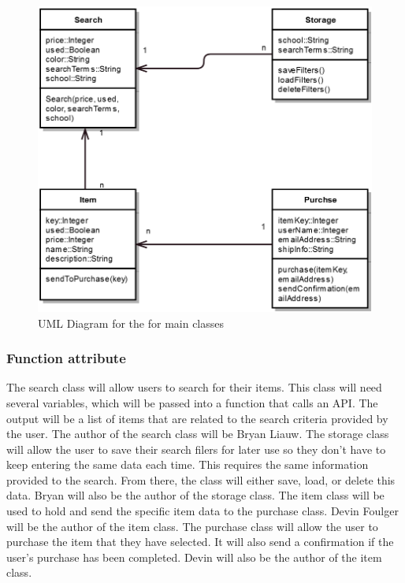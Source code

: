\documentclass[journal,compsoc, 10pt, draftclsnofoot, onecolumn]{IEEEtran}
\begin{document}
\begin{figure}[h]
\centering
\caption{UML Diagram for the for main classes}
\includegraphics[scale=.65]{projectUML}
\end{figure}
\FloatBarrier

\subsubsection*{Function attribute}
The search class will allow users to search for their items. This class will need 
several variables, which will be passed into a function that calls an API. The 
output will be a list of items that are related to the search criteria provided 
by the user. The author of the search class will be Bryan Liauw. 
The storage class will allow the user to save their search filers 
for later use so they don't have to keep entering the same data each time. This 
requires the same information provided to the search. From there, the class will 
either save, load, or delete this data. Bryan will also be the author of the storage 
class. The item class will be used to hold and 
send the specific item data to the purchase class. Devin Foulger will be the 
author of the item class. The purchase class will allow 
the user to purchase the item that they have selected. It will also send a 
confirmation if the user's purchase has been completed. Devin will also be the 
author of the item class.
\end{document}
